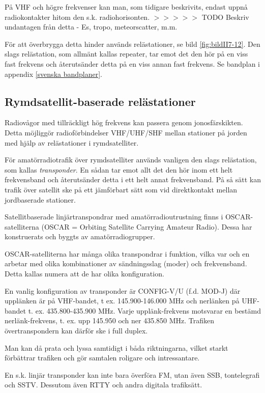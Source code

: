 På VHF och högre frekvenser kan man, som tidigare beskrivits, endast
uppnå radiokontakter hitom den s.k. radiohorisonten.
$>>>>>$ TODO Beskriv undantagen från detta - Es, tropo, meteorscatter, m.m.

För att överbrygga detta hinder används relästationer, se bild
\ref{fig:bildII7-12}. Den slags
relästation, som allmänt kallas repeater, tar emot det den hör på en
viss fast frekvens och återutsänder detta på en viss annan fast
frekvens. Se bandplan i appendix \ref{svenska bandplaner}.

\subsection{Rymdsatellit-baserade relästationer}

Radiovågor med tillräckligt hög frekvens kan passera genom
jonosfärskikten. Detta möjliggör radioförbindelser VHF/UHF/SHF mellan
stationer på jorden med hjälp av relästationer i rymdsatelliter.

För amatörradiotrafik över rymdsatelliter används vanligen den slags
relästation, som kallas \emph{transponder}. En sådan tar emot allt det
den hör inom ett helt frekvensband och återutsänder detta i ett helt
annat frekvensband. På så sätt kan trafik över satellit ske på ett
jämförbart sätt som vid direktkontakt mellan jordbaserade stationer.

Satellitbaserade linjärtranspondrar med amatörradioutrustning finns i
OSCAR-satelliterna (OSCAR = Orbiting Satellite Carrying Amateur
Radio). Dessa har konstruerats och byggts av amatörradiogrupper.

OSCAR-satelliterna har många olika transpondrar i funktion, vilka var
och en arbetar med olika kombinationer av sändningsslag (moder) och
frekvensband. Detta kallas numera att de har olika konfiguration.

En vanlig konfiguration av transponder är CONFIG-V/U (f.d. MOD-J) där
upplänken är på VHF-bandet, t ex. 145.900-146.000 MHz och nerlänken på
UHF-bandet t. ex.  435.800-435.900 MHz. Varje upplänk-frekvens
motsvarar en bestämd nerlänk-frekvens, t. ex. upp 145.950 och ner
435.850 MHz. Trafiken övertranspondern kan därför ske i full duplex.

Man kan då prata och lyssa samtidigt i båda riktningarna, vilket
starkt förbättrar trafiken och gör samtalen roligare och
intressantare.

En s.k. linjär transponder kan inte bara överföra FM, utan även SSB,
tontelegrafi och SSTV. Dessutom även RTTY och andra digitala
trafiksätt.

